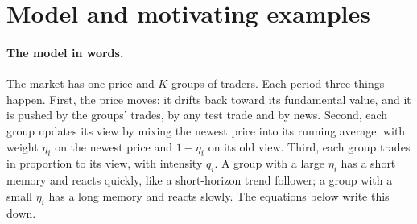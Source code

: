 \documentclass[12pt]{article}
\theoremstyle{definition}
\theoremstyle{remark}
\begin{document}
\section{Model and motivating examples}\label{sec:model}

\paragraph{The model in words.} The market has one price and $K$ groups of traders. Each period three things happen. First, the price moves: it drifts back toward its fundamental value, and it is pushed by the groups' trades, by any test trade and by news. Second, each group updates its view by mixing the newest price into its running average, with weight $\eta_i$ on the newest price and $1-\eta_i$ on its old view. Third, each group trades in proportion to its view, with intensity $q_i$. A group with a large $\eta_i$ has a short memory and reacts quickly, like a short-horizon trend follower; a group with a small $\eta_i$ has a long memory and reacts slowly. The equations below write this down.
\end{document}
